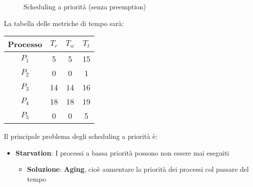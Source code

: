 \documentclass[a4paper]{article}
\begin{document}
\begin{example}
\begin{figure}[H]
    \caption{Scheduling a priorità (senza preemption)}
  \end{figure}

  \noindent
  La tabella delle metriche di tempo sarà:
  \begin{table}[H]
    \centering
    \begin{tabular}{c|c|c|c}
      Processo & \( T_r \) & \( T_w \) & \( T_t \) \\
      \hline
      \( P_1 \) & 5 & 5 & 15 \\
      \( P_2 \) & 0 & 0 & 1 \\
      \( P_3 \) & 14 & 14 & 16 \\
      \( P_4 \) & 18 & 18 & 19 \\
      \( P_5 \) & 0 & 0 & 5 \\
    \end{tabular}
  \end{table}
\end{example}

\noindent
Il principale problema degli scheduling a priorità è: 
\begin{itemize}
  \item \textbf{Starvation}: I processi a bassa priorità possono non essere mai eseguiti
    \begin{itemize}
      \item \textbf{Soluzione}: \textbf{Aging}, cioè aumentare la priorità dei processi
        col passare del tempo
    \end{itemize}
\end{itemize}
\end{document}
